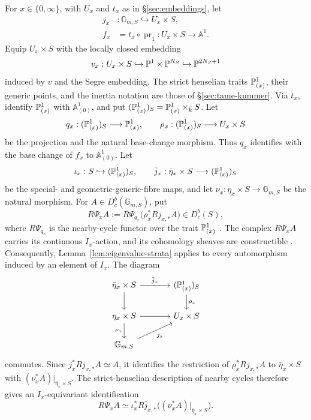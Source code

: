 \documentclass[12pt,reqno]{amsart}
\theoremstyle{definition}
\theoremstyle{plain}
\theoremstyle{definition}
\theoremstyle{remark}
\newcommand{\bbA}{\mathbb{A}}  \newcommand{\bbB}{\mathbb{B}}
\newcommand{\bbG}{\mathbb{G}}  \newcommand{\bbH}{\mathbb{H}}
\newcommand{\Db}{D^b_c}
\begin{document}
For \(x\in\{0,\infty\}\), with \(U_x\) and \(t_x\) as in
\S\ref{sec:embeddings}, let
\[
\begin{aligned}
 j_x&:\bbG_{m,S}\hookrightarrow U_x\times S,\\
 f_x&=t_x\circ\operatorname{pr}_1:U_x\times S\longrightarrow\bbA^1.
\end{aligned}
\]
Equip \(U_x\times S\) with the locally closed embedding
\[
        v_x:U_x\times S
        \hookrightarrow\mathbb{P}^1\times\mathbb{P}^{N_S}\hookrightarrow\mathbb{P}^{2N_S+1}
\]
induced by \(v\) and the Segre embedding.
The strict henselian traits \(\mathbb{P}^1_{(x)}\), their generic points, and the inertia notation are those
of \S\ref{sec:tame-kummer}.  Via \(t_x\), identify \(\mathbb{P}^1_{(x)}\) with \(\bbA^1_{(0)}\), and put
\((\mathbb{P}^1_{(x)})_S=\mathbb{P}^1_{(x)}\times_{\bar k}S\).  Let
\[
 q_x:(\mathbb{P}^1_{(x)})_S\longrightarrow\mathbb{P}^1_{(x)},
 \qquad
 \rho_x:(\mathbb{P}^1_{(x)})_S\longrightarrow U_x\times S
\]
be the projection and the natural base-change morphism.  Thus \(q_x\) identifies with the base change
of \(f_x\) to \(\bbA^1_{(0)}\).  Let
\[
 \iota_x:S\hookrightarrow(\mathbb{P}^1_{(x)})_S,
 \qquad
 \bar j_x:\bar\eta_x\times S\longrightarrow(\mathbb{P}^1_{(x)})_S
\]
be the special- and geometric-generic-fibre maps, and let
\(\nu_x:\eta_x\times S\to\bbG_{m,S}\) be the natural morphism.  For \(A\in\Db(\bbG_{m,S})\), put
\[
        R\Psi_x A:=R\Psi_{q_x}\bigl(\rho_x^*Rj_{x,*}A\bigr)\in\Db(S),
\]
where \(R\Psi_{q_x}\) is the nearby-cycle functor over the trait \(\mathbb{P}^1_{(x)}\)
\cite[Exp.~XIII, \S2.1]{SGA7II}.  The complex \(R\Psi_xA\) carries its continuous \(I_x\)-action, and its
cohomology sheaves are constructible
\cite[\textit{Th\'eor\`emes de finitude}, Th.~3.2]{SGA45}.  Consequently,
Lemma~\ref{lem:eigenvalue-strata} applies to every automorphism induced by an element of \(I_x\).
The diagram
\[
\begin{tikzcd}[column sep=large]
\bar\eta_x\times S \arrow[r,"\bar j_x"] \arrow[d]
&(\bbP^1_{(x)})_S \arrow[d,"\rho_x"]\\
\eta_x\times S \arrow[r] \arrow[d,"\nu_x"']
&U_x\times S\\
\bbG_{m,S}\arrow[ur,"j_x"']
\end{tikzcd}
\]
commutes.  Since \(j_x^*Rj_{x,*}A\simeq A\), it identifies the restriction of
\(\rho_x^*Rj_{x,*}A\) to \(\bar\eta_x\times S\) with
\((\nu_x^*A)|_{\bar\eta_x\times S}\).  The strict-henselian description of nearby cycles
\cite[Exp.~XIII, (2.1.2.3)]{SGA7II} therefore gives an
\(I_x\)-equivariant identification
\begin{equation}
\label{eq:strict-henselian-nearby-cycles}
        R\Psi_x A\simeq
        \iota_x^*R\bar j_{x,*}
        \bigl((\nu_x^*A)|_{\bar\eta_x\times S}\bigr).
\end{equation}
\end{document}
